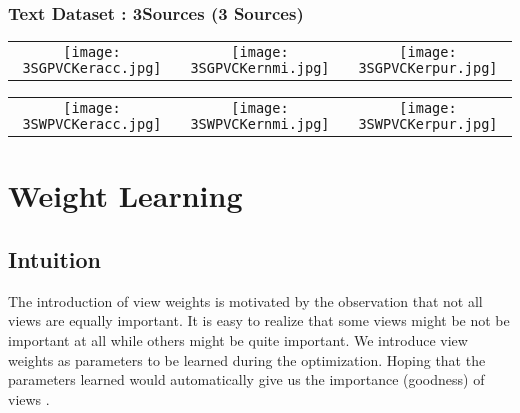 \documentclass[a4paper]{article}
\begin{document}
	\pagebreak			
	

	\subsubsection{Text Dataset : 3Sources (3 Sources)}

	\vspace{10mm}
	
	\begin{tabular}[H]{ccc}
		{\texttt{[image: 3SGPVCKeracc.jpg]}} 
    	& {\texttt{[image: 3SGPVCKernmi.jpg]}}
    	& {\texttt{[image: 3SGPVCKerpur.jpg]}}
	\end{tabular}
	\vspace{10mm}
	
	\begin{tabular}[H]{ccc}
		{\texttt{[image: 3SWPVCKeracc.jpg]}} 
    	& {\texttt{[image: 3SWPVCKernmi.jpg]}}
    	& {\texttt{[image: 3SWPVCKerpur.jpg]}}
	\end{tabular}
	\vspace{5mm}

	\restoregeometry	


	\section{Weight Learning}
	
	\subsection{Intuition}
		
	The introduction of view weights is motivated by the observation that not all views are equally important. It is easy to realize that some views might be not be important at all while others might be quite important. We introduce view weights as parameters to be learned during the optimization. Hoping that the parameters learned would automatically give us the importance (goodness) of views \cite{cai2013multi}.
\end{document}
